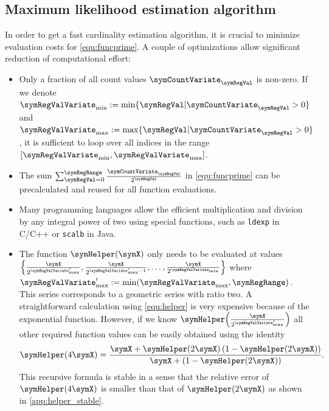 \documentclass[a4paper]{scrartcl}
\begin{document}
\subsection{Maximum likelihood estimation algorithm}
In order to get a fast cardinality estimation algorithm, it is crucial to minimize evaluation costs for \eqref{equ:funcprime}. A couple of optimizations allow significant reduction of computational effort:
\begin{itemize}
\item Only a fraction of all count values $\symCountVariate_\symRegVal$ is non-zero. If we denote $\symRegValVariate_\text{min}:=\min\lbrace \symRegVal\vert\symCountVariate_\symRegVal>0\rbrace$ and $\symRegValVariate_\text{max}:=\max\lbrace \symRegVal\vert\symCountVariate_\symRegVal>0\rbrace$,  it is sufficient to loop over all indices in the range $[\symRegValVariate_\text{min}, \symRegValVariate_\text{max}]$.
\item The sum $\sum_{\symRegVal=0}^\symRegRange \frac{\symCountVariate_\symRegVal}{2^\symRegVal}$ in \eqref{equ:funcprime} can be precalculated and reused for all function evaluations.
\item Many programming languages allow the efficient multiplication and division by any integral power of two using special functions, such as \texttt{ldexp} in C/C++ or \texttt{scalb} in Java.
\item The function $\symHelper(\symX)$ only needs to be evaluated at values $\left\lbrace\frac{\symX}{2^{\symRegValVariate'_\text{max}}},\frac{\symX}{2^{\symRegValVariate'_\text{max}-1}},\ldots,\frac{\symX}{2^{\symRegValVariate_\text{min}}}\right\rbrace$ where $\symRegValVariate'_\text{max} := \min(\symRegValVariate_\text{max}, \symRegRange)$. This series corresponds to a geometric series with ratio two. A straightforward calculation using \eqref{equ:helper} is very expensive because of the exponential function. However, if we know $\symHelper\!\left(\frac{\symX}{2^{\symRegValVariate'_\text{max}}}\right)$ all other required function values can be easily obtained using the identity
\begin{equation}
\label{equ:helper_recursion1}
\symHelper(4\symX) = \frac{\symX+\symHelper(2\symX)\left(1-\symHelper(2\symX)\right)}{\symX+\left(1-\symHelper(2\symX)\right)}.
\end{equation}
This recursive formula is stable in a sense that the relative error of $\symHelper(4\symX)$ is smaller than that of $\symHelper(2\symX)$ as shown in \cref{app:helper_stable}.


\end{itemize}
\end{document}
